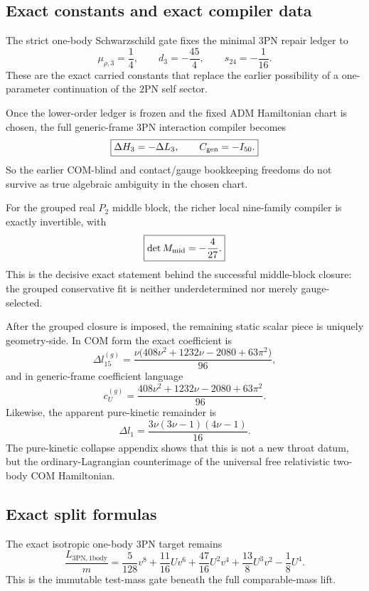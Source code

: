 \documentclass[11pt]{article}
\begin{document}
\subsection{Exact constants and exact compiler data}
\label{app:theorem-ledger-constants}

The strict one-body Schwarzschild gate fixes the minimal $3$PN repair ledger to
\[
\boxed{
\mu_{\rho,3}=\frac14,
\qquad
 d_3=-\frac{45}{4},
\qquad
 s_{24}=-\frac1{16}.
}
\]
These are the exact carried constants that replace the earlier possibility of a one-parameter continuation of the $2$PN self sector.

Once the lower-order ledger is frozen and the fixed ADM Hamiltonian chart is chosen, the full generic-frame $3$PN interaction compiler becomes
\[
\boxed{
\Delta H_3=-\Delta L_3,
\qquad
C_{\rm gen}=-I_{50}.
}
\]
So the earlier COM-blind and contact/gauge bookkeeping freedoms do not survive as true algebraic ambiguity in the chosen chart.

For the grouped real $P_2$ middle block, the richer local nine-family compiler is exactly invertible, with
\[
\boxed{
\det M_{\rm mid}=-\frac4{27}.
}
\]
This is the decisive exact statement behind the successful middle-block closure: the grouped conservative fit is neither underdetermined nor merely gauge-selected.

After the grouped closure is imposed, the remaining static scalar piece is uniquely geometry-side. In COM form the exact coefficient is
\[
\boxed{
\Delta l_{15}^{(g)}=
\frac{\nu\bigl(408\nu^2+1232\nu-2080+63\pi^2\bigr)}{96},
}
\]
and in generic-frame coefficient language
\[
\boxed{
 c_U^{(g)}=
 \frac{408\nu^2+1232\nu-2080+63\pi^2}{96}.
}
\]
Likewise, the apparent pure-kinetic remainder is
\[
\boxed{
\Delta l_1=
\frac{3\nu(3\nu-1)(4\nu-1)}{16}.
}
\]
The pure-kinetic collapse appendix shows that this is not a new throat datum, but the ordinary-Lagrangian counterimage of the universal free relativistic two-body COM Hamiltonian.

\subsection{Exact split formulas}
\label{app:theorem-ledger-split}

The exact isotropic one-body $3$PN target remains
\[
\boxed{
\frac{L_{3\mathrm{PN},1\mathrm{body}}}{m}
=
\frac5{128}v^8
+\frac{11}{16}Uv^6
+\frac{47}{16}U^2v^4
+\frac{13}{8}U^3v^2
-\frac18U^4.
}
\]
This is the immutable test-mass gate beneath the full comparable-mass lift.
\end{document}
